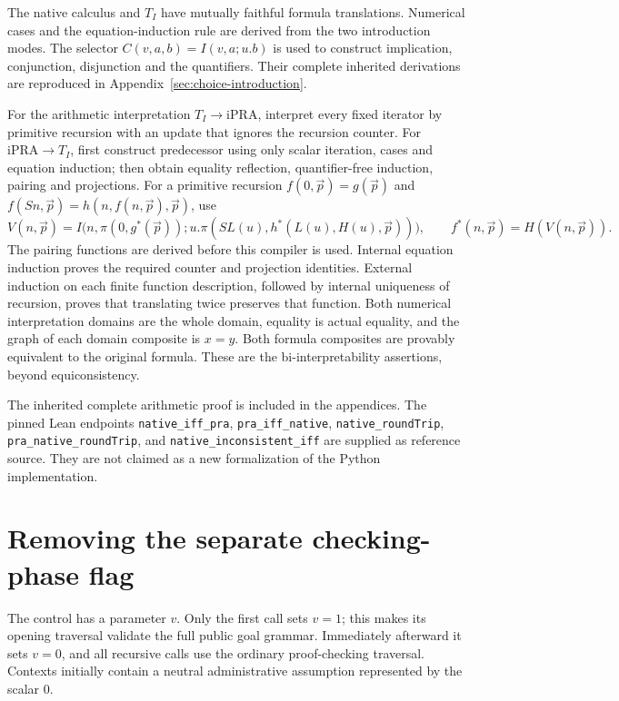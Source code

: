 \documentclass[11pt,a4paper]{article}
\theoremstyle{definition}\newtheorem{definition}[theorem]{Definition}
\theoremstyle{remark}\newtheorem{remark}[theorem]{Remark}
\newcommand{\ipra}{\mathrm{iPRA}}
\begin{document}
The native calculus and $T_I$ have mutually faithful formula translations.
Numerical cases and the equation-induction rule are derived from the two
introduction modes. The selector $C(v,a,b)=I(v,a;u.b)$ is used to construct
implication, conjunction, disjunction and the quantifiers. Their complete
inherited derivations are reproduced in Appendix~\ref{sec:choice-introduction}.

For the arithmetic interpretation $T_I\to\ipra$, interpret every fixed
iterator by primitive recursion with an update that ignores the recursion
counter. For $\ipra\to T_I$, first construct predecessor using only scalar
iteration, cases and equation induction; then obtain equality reflection,
quantifier-free induction, pairing and projections. For a primitive
recursion $f(0,\vec p)=g(\vec p)$ and
$f(Sn,\vec p)=h(n,f(n,\vec p),\vec p)$, use
\[
 V(n,\vec p)=I\bigl(n,\pi(0,g^*(\vec p));
 u.\pi(SL(u),h^*(L(u),H(u),\vec p))\bigr),
 \qquad f^*(n,\vec p)=H(V(n,\vec p)).
\]
The pairing functions are derived before this compiler is used. Internal
equation induction proves the required counter and projection identities.
External induction on each finite function description, followed by
internal uniqueness of recursion, proves that translating twice preserves
that function. Both numerical interpretation domains are the whole domain,
equality is actual equality, and the graph of each domain composite is
$x=y$. Both formula composites are provably equivalent to the original
formula. These are the bi-interpretability assertions, beyond equiconsistency.

The inherited complete arithmetic proof is included in the appendices.
The pinned Lean endpoints \texttt{native\_iff\_pra},
\texttt{pra\_iff\_native}, \texttt{native\_roundTrip},
\texttt{pra\_native\_roundTrip}, and
\texttt{native\_inconsistent\_iff} are supplied as reference source.
They are not claimed as a new formalization of the Python implementation.

\section{Removing the separate checking-phase flag}
\label{sec:context-phase}
The control has a parameter $v$. Only the first call sets $v=1$;
this makes its opening traversal validate the full public goal grammar.
Immediately afterward it sets $v=0$, and all recursive calls use the
ordinary proof-checking traversal. Contexts initially contain a neutral
administrative assumption represented by the scalar $0$.
\end{document}
